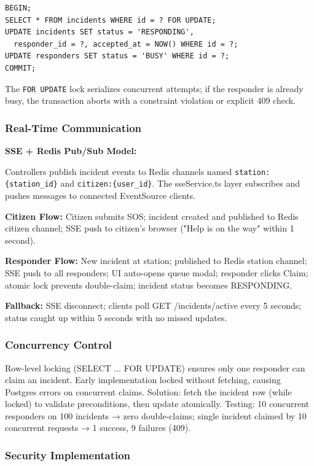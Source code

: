 \begin{verbatim}
BEGIN;
SELECT * FROM incidents WHERE id = ? FOR UPDATE;
UPDATE incidents SET status = 'RESPONDING',
  responder_id = ?, accepted_at = NOW() WHERE id = ?;
UPDATE responders SET status = 'BUSY' WHERE id = ?;
COMMIT;
\end{verbatim}

The \texttt{FOR UPDATE} lock serializes concurrent attempts; if the responder is already busy, the transaction aborts with a constraint violation or explicit 409 check.

\subsubsection{Real-Time Communication}

\textbf{SSE + Redis Pub/Sub Model:}

Controllers publish incident events to Redis channels named \texttt{station:\{station\_id\}} and \texttt{citizen:\{user\_id\}}. The sseService.ts layer subscribes and pushes messages to connected EventSource clients.

\textbf{Citizen Flow:} Citizen submits SOS; incident created and published to Redis citizen channel; SSE push to citizen's browser ("Help is on the way" within 1 second).

\textbf{Responder Flow:} New incident at station; published to Redis station channel; SSE push to all responders; UI auto-opens queue modal; responder clicks Claim; atomic lock prevents double-claim; incident status becomes RESPONDING.

\textbf{Fallback:} SSE disconnect; clients poll GET /incidents/active every 5 seconds; status caught up within 5 seconds with no missed updates.

\subsubsection{Concurrency Control}

Row-level locking (SELECT ... FOR UPDATE) ensures only one responder can claim an incident. Early implementation locked without fetching, causing Postgres errors on concurrent claims. Solution: fetch the incident row (while locked) to validate preconditions, then update atomically. Testing: 10 concurrent responders on 100 incidents → zero double-claims; single incident claimed by 10 concurrent requests → 1 success, 9 failures (409).

\subsubsection{Security Implementation}

